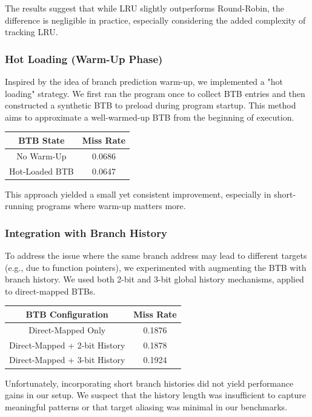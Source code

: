 The results suggest that while LRU slightly outperforms Round-Robin, the difference is negligible in practice, especially considering the added complexity of tracking LRU.

\subsubsection{Hot Loading (Warm-Up Phase)}

Inspired by the idea of branch prediction warm-up, we implemented a "hot loading" strategy. We first ran the program once to collect BTB entries and then constructed a synthetic BTB to preload during program startup. This method aims to approximate a well-warmed-up BTB from the beginning of execution.

\begin{center}
\begin{tabular}{|c|c|}
\hline
\textbf{BTB State} & \textbf{Miss Rate} \\
\hline
No Warm-Up & 0.0686 \\
Hot-Loaded BTB & 0.0647 \\
\hline
\end{tabular}
\end{center}

This approach yielded a small yet consistent improvement, especially in short-running programs where warm-up matters more.

\subsubsection{Integration with Branch History}

To address the issue where the same branch address may lead to different targets (e.g., due to function pointers), we experimented with augmenting the BTB with branch history. We used both 2-bit and 3-bit global history mechanisms, applied to direct-mapped BTBs.

\begin{center}
\begin{tabular}{|c|c|}
\hline
\textbf{BTB Configuration} & \textbf{Miss Rate} \\
\hline
Direct-Mapped Only & 0.1876 \\
Direct-Mapped + 2-bit History & 0.1878 \\
Direct-Mapped + 3-bit History & 0.1924 \\
\hline
\end{tabular}
\end{center}

Unfortunately, incorporating short branch histories did not yield performance gains in our setup. We suspect that the history length was insufficient to capture meaningful patterns or that target aliasing was minimal in our benchmarks.

